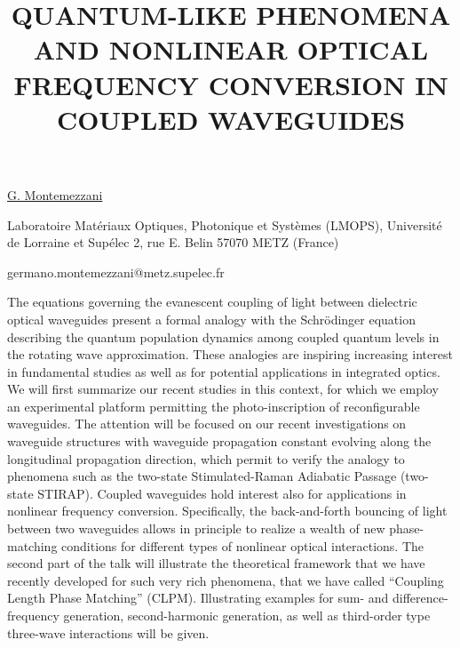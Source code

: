 \title{QUANTUM-LIKE PHENOMENA AND NONLINEAR OPTICAL FREQUENCY CONVERSION IN COUPLED WAVEGUIDES}

\underline{G. Montemezzani} 

{\normalsize{\vspace{-4mm}
Laboratoire Mat\'eriaux Optiques, Photonique et Syst\`emes (LMOPS),
Universit\'e de Lorraine et Sup\'elec 2, rue E. Belin
57070 METZ (France)

\email germano.montemezzani@metz.supelec.fr}}

The equations governing the evanescent coupling of light between dielectric optical waveguides present a formal analogy with the Schr\"{o}dinger equation describing the quantum population dynamics among coupled quantum levels in the rotating wave approximation. These analogies are inspiring increasing interest in fundamental studies as well as for potential applications in integrated optics. We will first summarize our recent studies in this context, for which we employ an experimental platform permitting the photo-inscription of reconfigurable waveguides. The attention will be focused on our recent investigations on waveguide structures with waveguide propagation constant evolving along the longitudinal propagation direction, which permit to verify the analogy to phenomena such as the two-state Stimulated-Raman Adiabatic Passage (two-state STIRAP).
Coupled waveguides hold interest also for applications in nonlinear frequency conversion. Specifically, the back-and-forth bouncing of light between two waveguides allows in principle to realize a wealth of new phase-matching conditions for different types of nonlinear optical interactions. The second part of the talk will illustrate the theoretical framework that we have recently developed for such very rich phenomena, that we have called ``Coupling Length Phase Matching'' (CLPM). Illustrating examples for sum- and difference-frequency generation, second-harmonic generation, as well as third-order type three-wave interactions will be given.

\vspace{\baselineskip}
